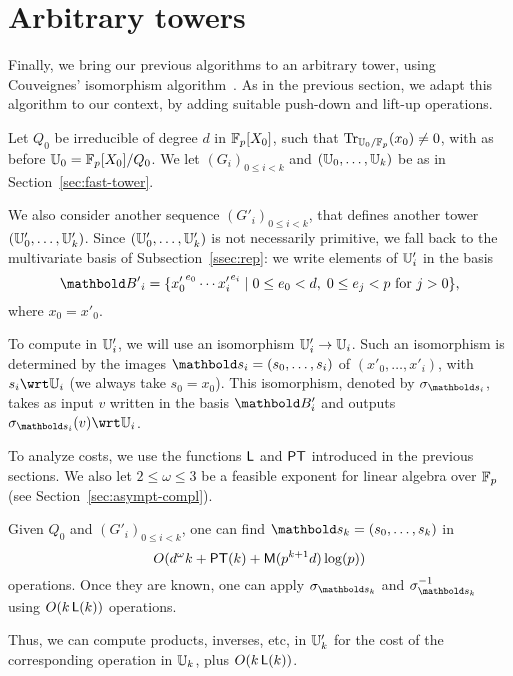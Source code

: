 

\section{Arbitrary towers}
\label{sec:couveignes-algorithm}

 Finally, we bring our
previous algorithms to an arbitrary tower, using Couveignes'
isomorphism algorithm~\cite{couveignes00}. As in the previous section,
we adapt this algorithm to our context, by adding suitable push-down
and lift-up operations.

Let $Q_0$ be irreducible of degree $d$ in $\mathbb{F}_p[X_0]$, such that
$\operatorname{Tr}_{\mathbb{U}_0/\mathbb{F}_p}(x_0)\ne0$, with as before
$\mathbb{U}_0=\mathbb{F}_p[X_0]/Q_0$. We let $(G_i)_{0 \le i < k}$ and
$(\mathbb{U}_0,\ldots,\mathbb{U}_k)$ be as in Section~\ref{sec:fast-tower}.

We also consider another sequence $(G'_i)_{0 \le i < k}$, that defines
another tower $(\mathbb{U}'_0,\ldots,\mathbb{U}'_k)$.  Since $(\mathbb{U}'_0,\ldots,\mathbb{U}'_k)$ is
not necessarily primitive, we fall back to the multivariate basis of
Subsection~\ref{ssec:rep}: we write elements of $\mathbb{U}'_i$ in the basis
  \begin{equation}
  \basis{B'}_i=
  \{{x'_0}^{e_0} \cdots {x'_i}^{e_i} \;|\; 0 \le e_0 < d,\; 0\le e_j < p 
  \text{ for $j>0$}\}
  \text{,}
\end{equation}
where $x_0=x'_0$.

To compute in $\mathbb{U}'_i$, we will use an isomorphism $\mathbb{U}'_i \rightarrow \mathbb{U}_i$.
Such an isomorphism is determined by the images
$\lst{s}_i=(s_0,\dots,s_i)$ of $(x'_0,\dots,x'_i)$, with $s_i \wrt
\U_i$ (we always take $s_0=x_0$). This isomorphism, denoted by
$\sigma_{\lst{s}_i}$, takes as input $v$ written in the basis
$\basis{B}'_i$ and outputs $\sigma_{\lst{s}_i}(v)\wrt \U_i$.

To analyze costs, we use the functions $\mathsf{L}$ and $\mathsf{PT}$ introduced
in the previous sections. We also let $2 \le \omega \le 3$ be a
feasible exponent for linear algebra over $\mathbb{F}_p$ (see
Section~\ref{sec:asympt-compl}).
\begin{theorem}\label{theo:main}
  Given $Q_0$ and $(G'_i)_{0 \le i < k}$, one can find
  $\lst{s}_k=(s_0,\dots,s_k)$ in 
  \begin{equation}
    \label{eq:105}
    O(d^\omega k + \mathsf{PT}(k) +
    \mathsf{M}(p^{k+1} d) \log(p))
  \end{equation}
  operations. Once they are known, one can apply $\sigma_{\lst{s}_k}$
  and $\sigma_{\lst{s}_k}^{-1}$ using $O(k\, \mathsf{L}(k))$ operations.
\end{theorem}
Thus, we can compute products, inverses, etc, in $\mathbb{U}'_k$ for
the cost of the corresponding operation in $\mathbb{U}_k$, plus $O(k\,
\mathsf{L}(k))$.

